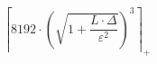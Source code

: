 \[\left\lceil 8192 \cdot \left(\sqrt{1 + \frac{L \cdot \Delta}{\varepsilon^{2}}}\right)^{3} \right\rceil_{+}\]

